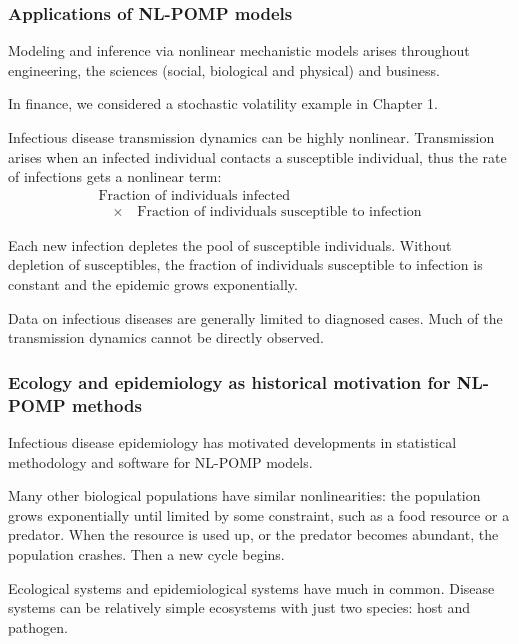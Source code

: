 \documentclass{beamer}\usepackage[]{graphicx}\usepackage[]{color}
\begin{document}
\begin{frame}[fragile] 

\frametitle{Applications of NL-POMP models}

\bi

\item Modeling and inference via nonlinear mechanistic models arises throughout engineering, the sciences (social, biological and physical) and business.

\item In finance, we considered a stochastic volatility example in Chapter 1.

\item Infectious disease transmission dynamics can be highly nonlinear. Transmission arises when an infected individual contacts a susceptible individual, thus the rate of infections gets a nonlinear term:
$$\begin{array}{ll}
\mbox{Fraction of individuals infected}\\
\quad\times\quad \mbox{Fraction of individuals susceptible to infection}
\end{array}$$

\item Each new infection depletes the pool of susceptible individuals.  Without depletion of susceptibles, the fraction of individuals susceptible to infection is constant and the epidemic grows exponentially. 

\item Data on infectious diseases are generally limited to diagnosed cases. Much of the transmission dynamics cannot be directly observed. 

\ei

\end{frame}

\begin{frame}[fragile]

\frametitle{Ecology and epidemiology as historical motivation for NL-POMP methods}

\bi

\item Infectious disease epidemiology has motivated developments in statistical methodology and software for NL-POMP models.

\item Many other biological populations have similar nonlinearities: the population grows exponentially until limited by some constraint, such as a food resource or a predator. When the resource is used up, or the predator becomes abundant, the population crashes. Then a new cycle begins.

\item Ecological systems and epidemiological systems have much in common. Disease systems can be relatively simple ecosystems with just two species: host and pathogen.

\ei

\end{frame}   
\end{document}
